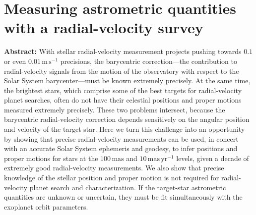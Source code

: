 \documentclass[12pt]{article}
\newcommand{\unit}[1]{\mathrm{#1}}
\newcommand{\m}{\unit{m}}
\newcommand{\s}{\unit{s}}
\newcommand{\mps}{\m\,\s^{-1}}
\newcommand{\mas}{\unit{mas}}
\newcommand{\yr}{\unit{yr}}
\newcommand{\maspyr}{\mas\,\yr^{-1}}
\begin{document}
\section*{Measuring astrometric quantities with a radial-velocity survey}

\noindent
\textbf{Abstract:}
With stellar radial-velocity measurement projects pushing towards
$0.1$ or even $0.01\,\mps$ precisions, the barycentric
correction---the contribution to radial-velocity signals from the
motion of the observatory with respect to the Solar System
barycenter---must be known extremely precisely.
At the same time, the brightest stars, which comprise some of the best
targets for radial-velocity planet searches, often do not have their
celestial positions and proper motions measured extremely precisely.
These two problems intersect, because the barycentric radial-velocity
correction depends sensitively on the angular position and velocity of
the target star.
Here we turn this challenge into an opportunity by showing that precise
radial-velocity measurements can be used, in concert with an accurate
Solar System ephemeris and geodesy, to infer positions and proper motions
for stars at the $100\,\mas$ and $10\,\maspyr$ levels, given a decade of
extremely good radial-velocity measurements.
We also show that precise knowledge of the stellar position and proper
motion is not required for radial-velocity planet search
and characterization.
If the target-star astrometric quantities are unknown or uncertain,
they must be fit simultaneously with the exoplanet orbit parameters.
\end{document}

